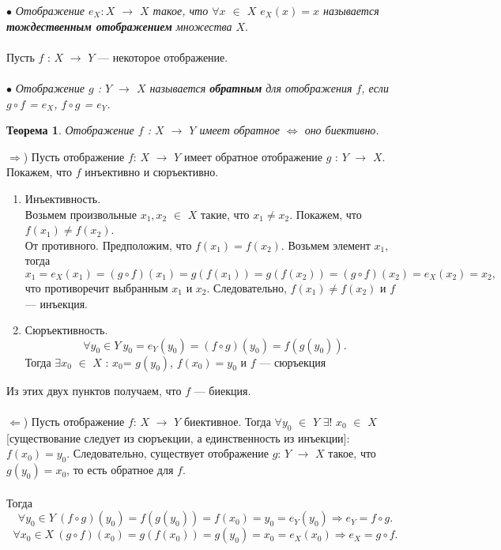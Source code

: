 $\bullet$ \textit{Отображение $e_X : X$ $\rightarrow$ $X$ такое, что $\forall x$ $\in$ $X$ $e_X(x) = x$ называется \textbf{тождественным отображением} множества $X$}.\\\\
Пусть $f$ : $X$ $\rightarrow$ $Y$ --- некоторое отображение. \\\\
$\bullet$ \textit{Отображение $g$ : $Y$ $\rightarrow$ $X$ называется \textbf{обратным} для отображения $f$, если $g \circ f$ = $e_X$, $f \circ g$ = $e_Y$.}
\newtheorem*{t6_2_2}{Теорема}\begin{t6_2_2} Отображение $f$ : $X$ $\rightarrow$ $Y$ имеет обратное $\Longleftrightarrow$ оно биективно.
\end{t6_2_2} \begin{Proof} $\Rightarrow$) Пусть отображение $f$: $X$ $\rightarrow$ $Y$ имеет обратное отображение $g$ : $Y$ $\rightarrow$ $X$. Покажем, что $f$ инъективно и сюръективно. \begin{enumerate}
		\item Инъективность.\\ 
		Возьмем произвольные $x_1, x_2$ $\in$ $X$ такие, что $x_1 \not= x_2$. Покажем, что $f(x_1) \not= f(x_2)$.\\
		От противного. Предположим, что $f(x_1) = f(x_2)$.
		Возьмем элемент $x_1$, тогда $$x_1 = e_X(x_1) = (g \circ f)(x_1) = g(f(x_1)) = g(f(x_2)) = (g \circ f)(x_2) = e_X(x_2) = x_2,$$ что противоречит выбранным $x_1$ и $x_2$. Следовательно, $f(x_1) \not= f(x_2)$ и $f$ --- инъекция.
		\item Сюръективность.\\ 
		$$\forall y_0 \in Y\ y_0 = e_Y (y_0) = (f \circ g)(y_0) = f(g(y_0)).$$ Тогда $\exists x_0$ $\in$ $X$ : $x_0$= $g(y_0)$, $f(x_0) = y_0$ и $f$ --- сюръекция
	\end{enumerate}
	Из этих двух пунктов получаем, что $f$ --- биекция.\\\\
	$\Leftarrow$) Пусть отображение $f$: $X$ $\rightarrow$ $Y$ биективное. Тогда $\forall$$y_0$ $\in$ $Y$ $\exists$$!$ $x_0$ $\in$ $X$  [существование следует из сюръекции, а единственность из инъекции]: $f(x_0) = y_0$. Следовательно, существует отображение $g$: $Y$ $\rightarrow$ $X$ такое, что $g(y_0) = x_0$, то есть обратное для $f$. \\\\
	Тогда $$\forall y_0 \in Y \ (f \circ g)(y_0) = f(g(y_0)) = f(x_0) = y_0 = e_Y(y_0) \Rightarrow e_Y = f \circ g.$$
	$$\forall x_0 \in X\ (g \circ f)(x_0) =  g(f(x_0))  =  g(y_0)  =  x_0  =  e_X(x_0) \Rightarrow e_X = g \circ f.$$
\end{Proof}
